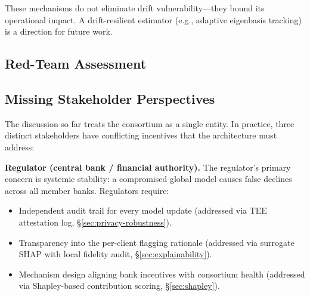 \documentclass[10pt,journal]{IEEEtran}
\begin{document}
These mechanisms do not eliminate drift vulnerability---they bound its operational impact. A drift-resilient estimator (e.g., adaptive eigenbasis tracking) is a direction for future work.

\subsection{Red-Team Assessment}

\begin{table}[t]
\centering
\caption{Counter-arguments and responses.}
\label{tab:redteam}
\footnotesize
{}
\end{table}

\subsection{Missing Stakeholder Perspectives}
\label{sec:stakeholders}

The discussion so far treats the consortium as a single entity. In practice, three distinct stakeholders have conflicting incentives that the architecture must address:

\textbf{Regulator (central bank / financial authority).} The regulator's primary concern is systemic stability: a compromised global model causes false declines across all member banks. Regulators require:
\begin{itemize}
  \item Independent audit trail for every model update (addressed via TEE attestation log, \S\ref{sec:privacy-robustness}).
  \item Transparency into the per-client flagging rationale (addressed via surrogate SHAP with local fidelity audit, \S\ref{sec:explainability}).
  \item Mechanism design aligning bank incentives with consortium health (addressed via Shapley-based contribution scoring, \S\ref{sec:shapley}).
\end{itemize}
\end{document}
